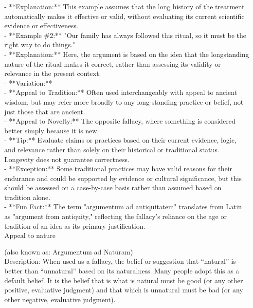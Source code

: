 \documentclass[a4paper,12pt,single,pdftex]{scrbook}
\begin{document}
    
      - **Explanation:** This example assumes that the long history of the treatment automatically makes it effective or valid, without evaluating its current scientific evidence or effectiveness.
    \\

    
      - **Example \#2:** "Our family has always followed this ritual, so it must be the right way to do things."
    \\

    
      - **Explanation:** Here, the argument is based on the idea that the longstanding nature of the ritual makes it correct, rather than assessing its validity or relevance in the present context.
    \\

    
      - **Variation:**
    \\

    
        - **Appeal to Tradition:** Often used interchangeably with appeal to ancient wisdom, but may refer more broadly to any long-standing practice or belief, not just those that are ancient.
    \\

    
        - **Appeal to Novelty:** The opposite fallacy, where something is considered better simply because it is new.
    \\

    
      - **Tip:** Evaluate claims or practices based on their current evidence, logic, and relevance rather than solely on their historical or traditional status. Longevity does not guarantee correctness.
    \\

    
      - **Exception:** Some traditional practices may have valid reasons for their endurance and could be supported by evidence or cultural significance, but this should be assessed on a case-by-case basis rather than assumed based on tradition alone.
    \\

    
      - **Fun Fact:** The term "argumentum ad antiquitatem" translates from Latin as "argument from antiquity," reflecting the fallacy’s reliance on the age or tradition of an idea as its primary justification.
    \\

  

Appeal to nature
    
      (also known as: Argumentum ad Naturam)
    \\

  
    Description: When used as a fallacy, the belief or suggestion that “natural” is better than “unnatural” based on its naturalness. Many people adopt this as a default belief. It is the belief that is what is natural must be good (or any other positive, evaluative judgment) and that which is unnatural must be bad (or any other negative, evaluative judgment).
\end{document}

